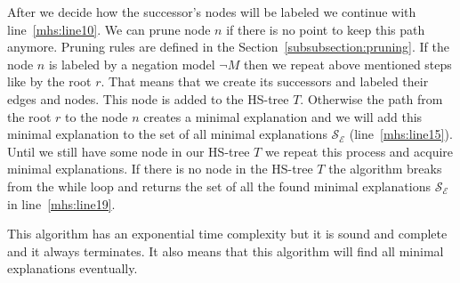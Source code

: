 \documentclass[12pt,a4paper]{article}
\begin{document}
After we decide how the successor's nodes will be labeled we continue with line~\ref{mhs:line10}. We can prune node $n$ if there is no point to keep this path anymore. Pruning rules are defined in the Section~\ref{subsubsection:pruning}. If the node $n$ is labeled by a negation model $\neg M$ then we repeat above mentioned steps like by the root $r$. That means that we create its successors and labeled their edges and nodes. This node is added to the HS-tree $T$. Otherwise the path from the root $r$ to the node $n$ creates a minimal explanation and we will add this minimal explanation to the set of all minimal explanations $\mathcal{S}_{\mathcal{E}}$ (line~\ref{mhs:line15}). Until we still have some node in our HS-tree $T$ we repeat this process and acquire minimal explanations. If there is no node in the HS-tree $T$ the algorithm breaks from the while loop and returns the set of all the found minimal explanations $\mathcal{S}_{\mathcal{E}}$ in line~\ref{mhs:line19}.

This algorithm has an exponential time complexity but it is sound and complete and it always terminates. It also means that this algorithm will find all minimal explanations eventually.
\end{document}

